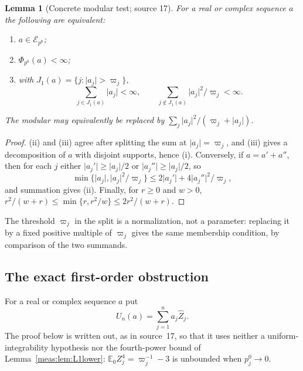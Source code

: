 \documentclass[11pt]{article}
\numberwithin{equation}{section}
\newtheorem{lemma}[theorem]{Lemma}
\theoremstyle{definition}
\theoremstyle{remark}
\newcommand{\E}{\mathbb E}
\newcommand{\abs}[1]{\lvert#1\rvert}
\newcommand{\Zh}{\widehat Z}
\newcommand{\Erow}{\mathcal E_{p^0}}
\begin{document}
\begin{lemma}[Concrete modular test; source 17]\label{meas:nb:lem:modular}
For a real or complex sequence $a$ the following are equivalent:
\begin{enumerate}[label=(\roman*)]
\item $a\in\Erow$;
\item $\Phi_{p^0}(a)<\infty$;
\item with $J_1(a)=\{j:\abs{a_j}>\varpi_j\}$,
\begin{equation}\label{meas:nb:eq:canonical-split}
 \sum_{j\in J_1(a)}\abs{a_j}<\infty,
 \qquad
 \sum_{j\notin J_1(a)}\abs{a_j}^2/\varpi_j<\infty.
\end{equation}
\end{enumerate}
The modular may equivalently be replaced by $\sum_j\abs{a_j}^2/(\varpi_j+\abs{a_j})$.
\end{lemma}
\begin{proof}
(ii) and (iii) agree after splitting the sum at $\abs{a_j}=\varpi_j$, and (iii)
gives a decomposition of $a$ with disjoint supports, hence (i). Conversely, if
$a=a'+a''$, then for each $j$ either $\abs{a_j'}\ge\abs{a_j}/2$ or
$\abs{a_j''}\ge\abs{a_j}/2$, so
\[
 \min\{\abs{a_j},\abs{a_j}^2/\varpi_j\}\le2\abs{a_j'}+4\abs{a_j''}^2/\varpi_j ,
\]
and summation gives (ii). Finally, for $r\ge0$ and $w>0$,
$r^2/(w+r)\le\min\{r,r^2/w\}\le2r^2/(w+r)$.
\end{proof}

The threshold $\varpi_j$ in the split is a normalization, not a parameter:
replacing it by a fixed positive multiple of $\varpi_j$ gives the same membership
condition, by comparison of the two summands.

\subsection{The exact first-order obstruction}\label{meas:nb:sub:first}

For a real or complex sequence $a$ put
\begin{equation}\label{meas:nb:eq:first-sum}
 U_n(a)=\sum_{j=1}^na_j\Zh_j .
\end{equation}
The proof below is written out, as in source~17, so that it uses neither a
uniform-integrability hypothesis nor the fourth-power bound of
Lemma~\ref{meas:lem:L1lower}: $\E_0Z_j^4=\varpi_j^{-1}-3$ is unbounded when
$p_j^0\to0$.
\end{document}
